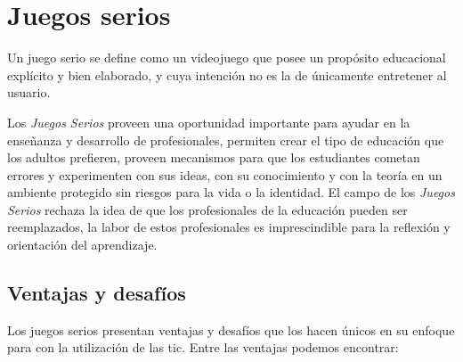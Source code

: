 
\section{Juegos serios}

Un juego serio se define como un videojuego que posee un propósito educacional explícito y
bien elaborado, y cuya intención no es la de únicamente entretener al
usuario\cite{abt1987serious,sg:aoverview,damien:sg}.

Los \emph{Juegos Serios} proveen una oportunidad importante para ayudar en
la enseñanza y desarrollo de profesionales\cite{mariluz:seiousgames}, permiten crear el tipo de educación que los adultos prefieren, proveen
mecanismos para que los estudiantes cometan errores y experimenten con sus
ideas, con su conocimiento y con la teoría en un ambiente protegido sin riesgos
para la vida o la identidad\cite{sg:aoverview}. El campo de los \emph{Juegos
    Serios} rechaza la idea de que los profesionales de la educación pueden ser
reemplazados, la labor de estos profesionales es imprescindible para la
reflexión y orientación del aprendizaje\cite{elearning:seiousgames}.

\subsection{Ventajas y desafíos}

Los juegos serios presentan ventajas y desafíos que los hacen únicos en su enfoque
para con la utilización de las \gls{tic}. Entre las ventajas podemos encontrar:


